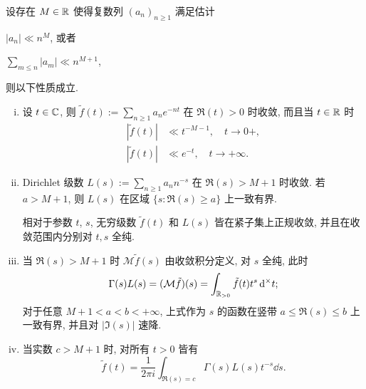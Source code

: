 \begin{theorem}\label{prop:Mellin-transform}
	设存在 $M \in \mathbb{R}$ 使得复数列 $(a_n)_{n \geq 1}$ 满足估计
	\begin{compactenum}[(a)]
		\item $|a_n| \ll n^M$, 或者
		\item $\sum_{m \leq n} |a_m| \ll n^{M+1}$,
	\end{compactenum}
	则以下性质成立.
	\begin{enumerate}[(i)]
		\item 设 $t \in \mathbb{C}$, 则 $\tilde{f}(t) := \sum_{n \geq 1} a_n e^{-nt}$ 在 $\Re(t) > 0$ 时收敛, 而且当 $t \in \mathbb{R}$ 时
		\begin{align*}
			|\tilde{f}(t)| & \ll t^{-M - 1}, \quad t \to 0+ , \\
			|\tilde{f}(t)| & \ll e^{-t}, \quad t \to +\infty.
		\end{align*}
		\item Dirichlet 级数 $L(s) := \sum_{n \geq 1} a_n n^{-s} $ 在 $\Re(s) > M+1$ 时收敛. 若 $a > M+1$, 则 $L(s)$ 在区域 $\{s: \Re(s) \geq a\}$ 上一致有界.
		
		相对于参数 $t$, $s$, 无穷级数 $\tilde{f}(t)$ 和 $L(s)$ 皆在紧子集上正规收敛, 并且在收敛范围内分别对 $t,s$ 全纯.
		\item 当 $\Re(s) > M+1$ 时 $\mathcal{M}\tilde{f}(s)$ 由收敛积分定义, 对 $s$ 全纯, 此时
			\[ \Gamma(s) L(s) = (\mathcal{M}\tilde{f})(s) = \int_{\mathbb{R}_{>0}} \tilde{f}(t) t^s \mathop{}\!\mathrm{d}^\times t; \]
			对于任意 $M + 1 < a < b < +\infty$, 上式作为 $s$ 的函数在竖带 $a \leq \Re(s) \leq b$ 上一致有界, 并且对 $|\Im(s)|$ 速降.
		\item 当实数 $c > M + 1$ 时, 对所有 $t > 0$ 皆有
			\[ \tilde{f}(t) = \frac{1}{2\pi i} \int_{\Re(s)=c} \Gamma(s) L(s) t^{-s} \dd s. \]
	\end{enumerate}
\end{theorem}


